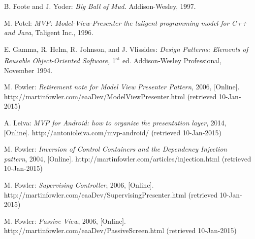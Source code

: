 \begin{thebibliography}{1}
B. Foote and J. Yoder: \emph{Big Ball of Mud.} Addison-Wesley, 1997.

M. Potel: \emph{MVP: Model-View-Presenter the taligent programming model for C++ and Java}, Taligent Inc., 1996.

E. Gamma, R. Helm, R. Johnson, and J. Vlissides: \emph{Design Patterns: Elements of Reusable Object-Oriented Software,} 1\textsuperscript{st} ed. Addison-Wesley Professional, November 1994.

M. Fowler: \emph{Retirement note for Model View Presenter Pattern}, 2006, 
[Online]. http://martinfowler.com/eaaDev/ModelViewPresenter.html (retrieved 10-Jan-2015)

A. Leiva: \emph{MVP for Android: how to organize the presentation layer}, 2014, 
[Online]. http://antonioleiva.com/mvp-android/ (retrieved 10-Jan-2015)

M. Fowler: \emph{Inversion of Control Containers and the Dependency Injection pattern}, 2004, 
[Online]. http://martinfowler.com/articles/injection.html (retrieved 10-Jan-2015)

M. Fowler: \emph{Supervising Controller}, 2006, 
[Online]. http://martinfowler.com/eaaDev/SupervisingPresenter.html (retrieved 10-Jan-2015)

M. Fowler: \emph{Passive View}, 2006, 
[Online]. http://martinfowler.com/eaaDev/PassiveScreen.html (retrieved 10-Jan-2015)

\end{thebibliography}